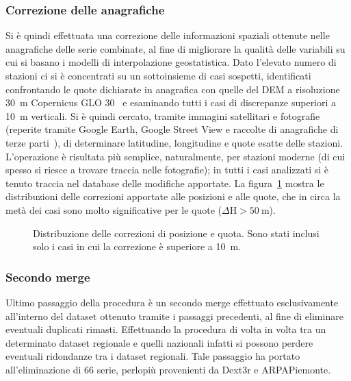 \subsubsection{Correzione delle anagrafiche}
Si è quindi effettuata una correzione delle informazioni spaziali ottenute nelle anagrafiche delle serie combinate, al fine di migliorare la qualità delle variabili su cui si basano i modelli di interpolazione geostatistica. Dato l'elevato numero di stazioni ci si è concentrati su un sottoinsieme di casi sospetti, identificati confrontando le quote dichiarate in anagrafica con quelle del DEM a risoluzione \qty{30}{\meter} Copernicus GLO 30~\cite{europeanspaceagencyCopernicusGlobalEuropean2022} e esaminando tutti i casi di discrepanze superiori a \qty{10}{\meter} verticali. Si è quindi cercato, tramite immagini satellitari e fotografie (reperite tramite Google Earth, Google Street View e raccolte di anagrafiche di terze parti~\cite{associazionelineameteoStazioniReteLinea}), di determinare latitudine, longitudine e quote esatte delle stazioni. L'operazione è risultata più semplice, naturalmente, per stazioni moderne (di cui spesso si riesce a trovare traccia nelle fotografie); in tutti i casi analizzati si è tenuto traccia nel database delle modifiche apportate. La figura~\ref{fig:corrections-deltas} mostra le distribuzioni delle correzioni apportate alle posizioni e alle quote, che in circa la metà dei casi sono molto significative per le quote (\(\Delta \mathrm{H} > \qty{50}{\meter}\)).

\begin{figure}[ht]
  \centering
  
  \caption{Distribuzione delle correzioni di posizione e quota. Sono stati inclusi solo i casi in cui la correzione è superiore a \qty{10}{\meter}.}\label{fig:corrections-deltas}
\end{figure}

%   

\subsubsection{Secondo merge}
Ultimo passaggio della procedura è un secondo merge effettuato esclusivamente all'interno del dataset ottenuto tramite i passaggi precedenti, al fine di eliminare eventuali duplicati rimasti. Effettuando la procedura di volta in volta tra un determinato dataset regionale e quelli nazionali infatti si possono perdere eventuali ridondanze tra i dataset regionali. Tale passaggio ha portato all'eliminazione di 66 serie, perlopiù provenienti da Dext3r e ARPAPiemonte.

